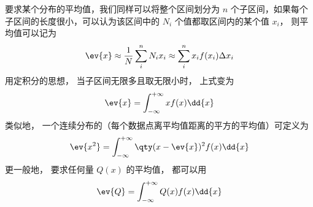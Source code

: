 要求某个分布的平均值，我们同样可以将整个区间划分为 $n$ 个子区间，如果每个子区间的长度很小，可以认为该区间中的 $N_i$ 个值都取区间内的某个值 $x_i$， 则平均值可以记为
\begin{equation}
\ev{x} \approx \frac1N \sum_i^n N_i x_i \approx \sum_i^n x_i f(x_i)\Delta x_i
\end{equation}
用定积分的思想， 当子区间无限多且取无限小时， 上式变为
\begin{equation}
\ev{x} = \int_{-\infty}^{+\infty} x f(x) \dd{x}
\end{equation}
类似地， 一个连续分布的（每个数据点离平均值距离的平方的平均值）可定义为
\begin{equation}
\ev{x^2} = \int_{-\infty}^{+\infty} \qty(x-\ev{x})^2 f(x) \dd{x}
\end{equation}
更一般地， 要求任何量 $Q(x)$ 的平均值， 都可以用
\begin{equation}
\ev{Q} = \int_{-\infty}^{+\infty} Q(x) f(x) \dd{x}
\end{equation}